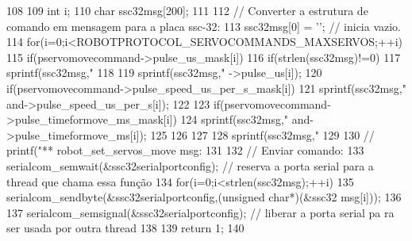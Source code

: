 \begin{DoxyCode}
108 {
109         int i;
110         char ssc32msg[200];
111         
112         // Converter a estrutura de comando em mensagem para a placa ssc-32:
113         ssc32msg[0] = '\0'; // inicia vazio.
114         for(i=0;i<ROBOTPROTOCOL_SERVOCOMMANDS_MAXSERVOS;++i){
115                 if(pservomovecommand->pulse_us_mask[i]){
116                         if(strlen(ssc32msg)!=0){
117                                 sprintf(ssc32msg,"%
118                         }
119                         sprintf(ssc32msg,"%
      ->pulse_us[i]);
120                         if(pservomovecommand->pulse_speed_us_per_s_mask[i]){
121                                 sprintf(ssc32msg,"%
      and->pulse_speed_us_per_s[i]);
122                         }
123                         if(pservomovecommand->pulse_timeformove_ms_mask[i]){
124                                 sprintf(ssc32msg,"%
      and->pulse_timeformove_ms[i]);
125                         }
126                 }
127         }
128         sprintf(ssc32msg,"%
129 
130 //      printf("\n *** robot_set_servos_move msg: %
131         
132         // Enviar comando:
133         serialcom_semwait(&ssc32serialportconfig); // reserva a porta serial para
       a thread que chama essa função
134         for(i=0;i<strlen(ssc32msg);++i){
135                 serialcom_sendbyte(&ssc32serialportconfig,(unsigned char*)(&ssc32
      msg[i]));
136         }
137         serialcom_semsignal(&ssc32serialportconfig); // liberar a porta serial pa
      ra ser usada por outra thread
138 
139         return 1;
140 }
\end{DoxyCode}
